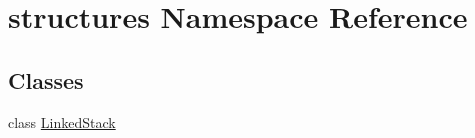 \hypertarget{namespacestructures}{}\section{structures Namespace Reference}
\label{namespacestructures}
\subsection*{Classes}
\begin{DoxyCompactItemize}
\item 
class \mbox{\hyperlink{classstructures_1_1_linked_stack}{Linked\+Stack}}
\end{DoxyCompactItemize}
